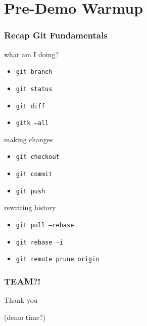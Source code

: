 \documentclass{beamer}
\begin{document}
\section{Pre-Demo Warmup}


\begin{frame}
\frametitle{Recap Git Fundamentals}
\begin{block}{what am I doing?}
    \begin{itemize}
        \item \texttt{git branch}
        \item \texttt{git status}
        \item \texttt{git diff}
        \item \texttt{gitk --all}
    \end{itemize}
\end{block}

\begin{block}{making changes}
    \begin{itemize}
        \item \texttt{git checkout}
        \item \texttt{git commit}
        \item \texttt{git push}
    \end{itemize}
\end{block}

\begin{block}{rewriting history}
    \begin{itemize}
        \item \texttt{git pull --rebase}
        \item \texttt{git rebase -i}
        \item \texttt{git remote prune origin}
    \end{itemize}
\end{block}

\end{frame}

\begin{frame}
\frametitle{TEAM?!}
\begin{center}
    {\Huge Thank you}

    (demo time?)
\end{center} 
\end{frame}
\end{document}
